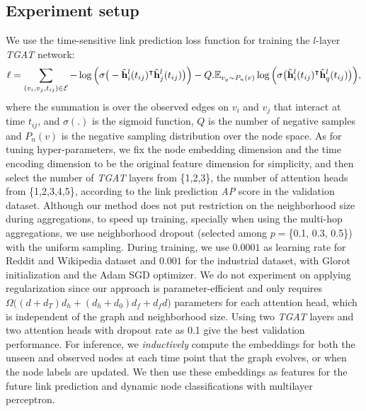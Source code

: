 \documentclass{article} %
\newcommand{\hbf}{\mathbf{h}}
\begin{document}
\subsection{Experiment setup}
\label{sec:setup}
We use the time-sensitive link prediction loss function for training the $l$-layer \textsl{TGAT} network:
\begin{equation}
\label{eqn:loss}
\ell = \sum_{(v_i,v_j,t_{ij}) \in \mathcal{E}} -\log \Big( \sigma \big(- \tilde{\hbf}_i^{l}(t_{ij})^{\intercal} \tilde{\hbf}_j^{l}(t_{ij}) \big) \Big) - Q.\E_{v_q \sim P_n(v)} \log \Big( \sigma \big( \tilde{\hbf}_i^{l}(t_{ij})^{\intercal} \tilde{\hbf}_q^{l}(t_{ij}) \big) \Big),
\end{equation}
where the summation is over the observed edges on $v_i$ and $v_j$ that interact at time $t_{ij}$, and $\sigma(.)$ is the sigmoid function, $Q$ is the number of negative samples and $P_n(v)$ is the negative sampling distribution over the node space. As for tuning hyper-parameters, we fix the node embedding dimension and the time encoding dimension to be the original feature dimension for simplicity, and then select the number of \textsl{TGAT} layers from \{1,2,3\}, the number of attention heads from \{1,2,3,4,5\}, according to the link prediction \emph{AP} score in the validation dataset. Although our method does not put restriction on the neighborhood size during aggregations, to speed up training, specially when using the multi-hop aggregations, we use neighborhood dropout (selected among $p=$\{0.1, 0.3, 0.5\}) with the uniform sampling. During training, we use $0.0001$ as learning rate for Reddit and Wikipedia dataset and $0.001$ for the industrial dataset, with Glorot initialization and the Adam SGD optimizer. We do not experiment on applying regularization since our approach is parameter-efficient and only requires $\Omega\big( (d+d_T)d_h + (d_h+d_0)d_f + d_f d \big)$ parameters for each attention head, which is independent of the graph and neighborhood size. Using two \textsl{TGAT} layers and two attention heads with dropout rate as 0.1 give the best validation performance.
For inference, we \emph{inductively} compute the embeddings for both the unseen and observed nodes at each time point that the graph evolves, or when the node labels are updated. We then use these embeddings as features for the future link prediction and dynamic node classifications with multilayer perceptron. 
\end{document}

